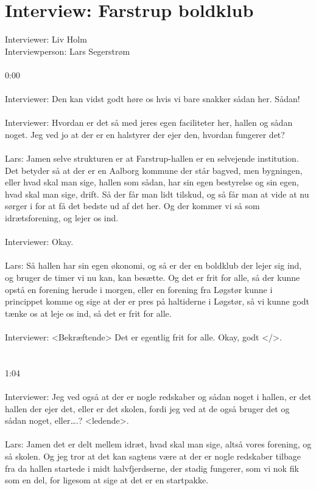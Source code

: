 \chapter{Interview: Farstrup boldklub}\label{ch:appBlabel}
Interviewer: Liv Holm\\
Interviewperson: Lars Segerstrøm
\\
\\
0:00
\\\\
Interviewer: Den kan vidst godt høre os hvis vi bare snakker sådan her. Sådan!
\\\\
Interviewer: Hvordan er det så med jeres egen faciliteter her, hallen og sådan noget. Jeg ved jo at der er en halstyrer der ejer den, hvordan fungerer det?
\\\\
Lars: Jamen selve strukturen er at Farstrup-hallen er en selvejende institution. Det betyder så at der er en Aalborg kommune der står bagved, men bygningen, eller hvad skal man sige, hallen som sådan, har sin egen bestyrelse og sin egen, hvad skal man sige, drift. Så der får man lidt tilskud, og så får man at vide at nu sørger i for at få det bedste ud af det her. Og der kommer vi så som idrætsforening, og lejer os ind.
\\\\
Interviewer: Okay.
\\\\
Lars: Så hallen har sin egen økonomi, og så er der en boldklub der lejer sig ind, og bruger de timer vi nu kan, kan besætte. Og det er frit for alle, så der kunne opstå en forening herude i morgen, eller en forening fra Løgstør kunne i princippet komme og sige at der er pres på haltiderne i Løgstør, så vi kunne godt tænke os at leje os ind, så det er frit for alle.
\\\\
Interviewer: <Bekræftende> Det er egentlig frit for alle. Okay, godt </>.
\\\\\\
1:04
\\\\
Interviewer: Jeg ved også at der er nogle redskaber og sådan noget i hallen, er det hallen der ejer det, eller er det skolen, fordi jeg ved at de også bruger det og sådan noget, eller….? <ledende>.
\\\\
Lars: Jamen det er delt mellem idræt, hvad skal man sige, altså vores forening, og så skolen. Og jeg tror at det kan sagtens være at der er nogle redskaber tilbage fra da hallen startede i midt halvfjerdserne, der stadig fungerer, som vi nok fik som en del, for ligesom at sige at det er en startpakke.
